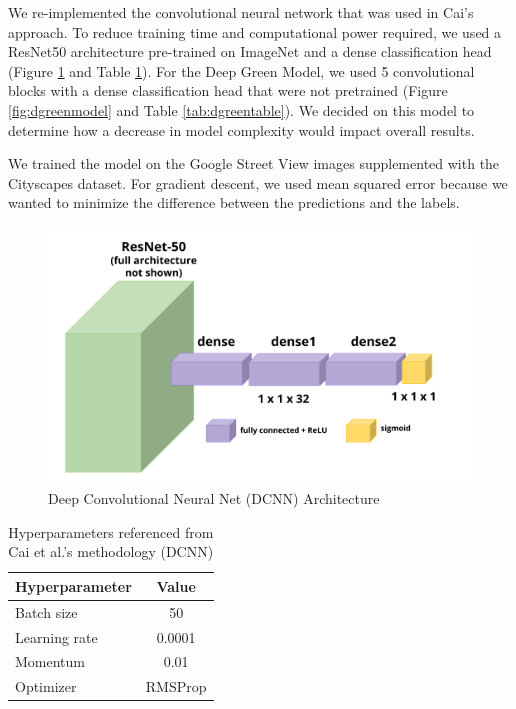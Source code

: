 We re-implemented the convolutional neural network that was used in Cai’s approach. To reduce training time and computational power required, we used a ResNet50 architecture pre-trained on ImageNet and a dense classification head (Figure \ref{fig:dcnnmodel} and Table \ref{tab:dcnntable}). For the Deep Green Model, we used 5 convolutional blocks with a dense classification head that were not pretrained (Figure \ref{fig:dgreenmodel} and Table \ref{tab:dgreentable}). We decided on this model to determine how a decrease in model complexity would impact overall results.

We trained the model on the Google Street View images supplemented with the Cityscapes dataset. For gradient descent, we used mean squared error because we wanted to minimize the difference between the predictions and the labels. 

\begin{figure}[t]
    \centering
    \includegraphics[width=\linewidth]{DCNN.png}
    \caption{Deep Convolutional Neural Net (DCNN) Architecture}
    \label{fig:dcnnmodel}
\end{figure}

\begin{table}
\begin{center}
\begin{tabular}{ l c }
\toprule
Hyperparameter & Value \\
\midrule
Batch size & 50 \\
Learning rate & 0.0001 \\
Momentum & 0.01\\
Optimizer & RMSProp\\
\bottomrule
\end{tabular}
\end{center}
\caption{Hyperparameters referenced from Cai et al.'s methodology (DCNN)}
\label{tab:dcnntable}
\end{table}

